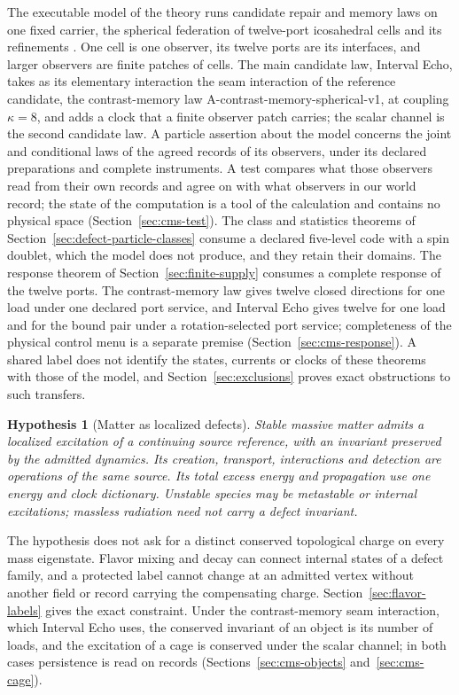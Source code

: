 \documentclass[11pt]{article}
\newtheorem{hypothesis}[theorem]{Hypothesis}
\begin{document}
The executable model of the theory runs candidate repair and memory laws on
one fixed carrier, the spherical federation of twelve-port icosahedral cells
and its refinements \cite{ophmodel}. One cell is one observer, its twelve
ports are its interfaces, and larger observers are finite patches of cells.
The main candidate law, Interval Echo, takes as its elementary interaction
the seam interaction of the reference candidate, the contrast-memory law
A-contrast-memory-spherical-v1, at coupling $\kappa=8$, and adds a clock that
a finite observer patch carries; the scalar channel is the second candidate
law. A particle assertion about the model concerns the
joint and conditional laws of the agreed records of its observers, under
its declared preparations and complete instruments.
A test compares what those observers read from their own records and agree
on with what observers in our world record; the state of the computation is
a tool of the calculation and contains no physical space
(Section~\ref{sec:cms-test}). The class and statistics theorems of
Section~\ref{sec:defect-particle-classes} consume a declared five-level code
with a spin doublet, which the model does not produce, and they retain their
domains. The response theorem of Section~\ref{sec:finite-supply} consumes a
complete response of the twelve ports. The contrast-memory law gives twelve
closed directions for one load under one declared port service, and Interval
Echo gives twelve for one load and for the bound pair under a
rotation-selected port service; completeness of the physical control menu is
a separate premise (Section~\ref{sec:cms-response}).
A shared label does not identify the states, currents or clocks of these
theorems with those of the model, and Section~\ref{sec:exclusions} proves
exact obstructions to such transfers.

\begin{hypothesis}[Matter as localized defects]
\label{hyp:defect}
Stable massive matter admits a localized excitation of a continuing source
reference, with an invariant preserved by the admitted dynamics. Its creation,
transport, interactions and detection are operations of the same source.
Its total excess energy and propagation use one energy and clock dictionary.
Unstable species may be metastable or internal excitations; massless radiation
need not carry a defect invariant.
\end{hypothesis}

The hypothesis does not ask for a distinct conserved topological charge on every
mass eigenstate. Flavor mixing and decay can connect internal states of a defect
family, and a protected label cannot change at an admitted vertex without another
field or record carrying the compensating charge. Section~\ref{sec:flavor-labels}
gives the exact constraint. Under the contrast-memory seam interaction, which
Interval Echo uses, the conserved invariant of an object is its number of
loads, and the excitation of a cage is conserved under the scalar channel; in
both cases persistence is read on records
(Sections~\ref{sec:cms-objects} and~\ref{sec:cms-cage}).
\end{document}
